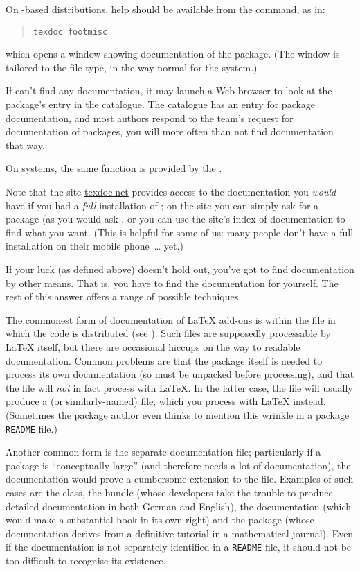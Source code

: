 On \texlive{}-based distributions, help should be available from the
 command, as in:
\begin{quote}
\begin{verbatim}
texdoc footmisc
\end{verbatim}
\end{quote}
which opens a window showing documentation of the 
package.  (The window is tailored to the file type, in the way normal
for the system.)

If  can't find any documentation, it may launch a Web
browser to look at the package's entry in the  catalogue.
The catalogue has an entry for package documentation, and most authors
respond to the  team's request for documentation of
packages, you will more often than not find documentation that way.

On \miktex{} systems, the same function is provided by the
.

Note that the site \url{texdoc.net} provides access to the
documentation you \emph{would} have if you had a \emph{full}
installation of \texlive{}; on the site you can simply ask for a
package (as you would ask , or you can use the site's
index of documentation to find what you want.  (This is helpful for
some of us: many people don't have a full \alltex{} installation on
their mobile phone~\dots{} yet.)

If your luck (as defined above) doesn't hold out, you've got to find
documentation by other means.  That is, you have to find the
documentation for yourself.  The rest of this answer offers a range of
possible techniques.

The commonest form of documentation of \LaTeX{} add-ons is within the
 file in which the code is distributed (see
).  Such files
are supposedly processable by \LaTeX{} itself, but there are
occasional hiccups on the way to readable documentation.  Common
problems are that the package itself is needed to process its own
documentation (so must be unpacked before processing), and that the
 file will \emph{not} in fact process with \LaTeX{}.  In the
latter case, the  file will usually produce a
 (or similarly-named) file, which you process with
\LaTeX{} instead.  (Sometimes the package author even thinks to
mention this wrinkle in a package \texttt{README} file.)

Another common form is the separate documentation file; particularly
if a package is ``conceptually large'' (and therefore needs a lot of
documentation), the documentation would prove a cumbersome extension
to the  file.  Examples of such cases are the 
class, the  bundle
(whose developers take the trouble to produce detailed documentation
in both German and English), the  documentation (which
would make a substantial book in its own right)
and the  package (whose
documentation derives from a definitive tutorial in a mathematical
journal).  Even if the documentation is not separately identified in a
\texttt{README} file, it should not be too difficult to recognise its
existence.

